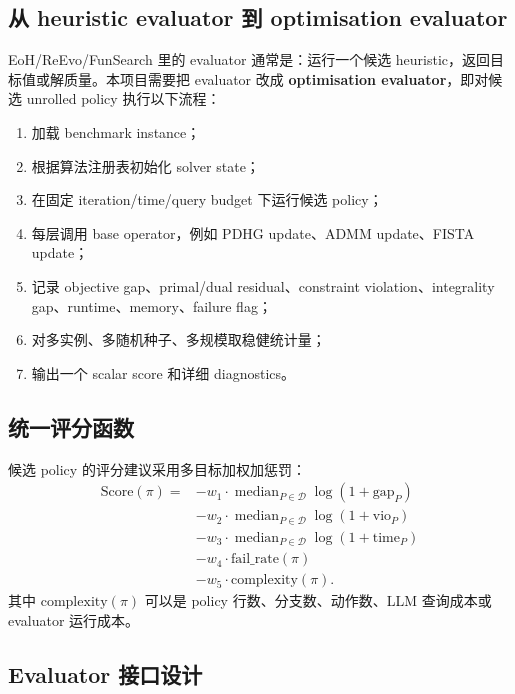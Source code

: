 \documentclass[12pt,a4paper]{ctexart}
\begin{document}
\subsection{从 heuristic evaluator 到 optimisation evaluator}
EoH/ReEvo/FunSearch 里的 evaluator 通常是：运行一个候选 heuristic，返回目标值或解质量。本项目需要把 evaluator 改成 \textbf{optimisation evaluator}，即对候选 unrolled policy 执行以下流程：
\begin{enumerate}
    \item 加载 benchmark instance；
    \item 根据算法注册表初始化 solver state；
    \item 在固定 iteration/time/query budget 下运行候选 policy；
    \item 每层调用 base operator，例如 PDHG update、ADMM update、FISTA update；
    \item 记录 objective gap、primal/dual residual、constraint violation、integrality gap、runtime、memory、failure flag；
    \item 对多实例、多随机种子、多规模取稳健统计量；
    \item 输出一个 scalar score 和详细 diagnostics。
\end{enumerate}

\subsection{统一评分函数}
候选 policy 的评分建议采用多目标加权加惩罚：
\begin{equation}
\begin{aligned}
\mathrm{Score}(\pi) =
&-w_1\cdot \operatorname{median}_{P\in\mathcal{D}}\log(1+\mathrm{gap}_P) \\
&-w_2\cdot \operatorname{median}_{P\in\mathcal{D}}\log(1+\mathrm{vio}_P) \\
&-w_3\cdot \operatorname{median}_{P\in\mathcal{D}}\log(1+\mathrm{time}_P) \\
&-w_4\cdot \mathrm{fail\_rate}(\pi) \\
&-w_5\cdot \mathrm{complexity}(\pi).
\end{aligned}
\end{equation}
其中 $\mathrm{complexity}(\pi)$ 可以是 policy 行数、分支数、动作数、LLM 查询成本或 evaluator 运行成本。

\subsection{Evaluator 接口设计}
\end{document}
